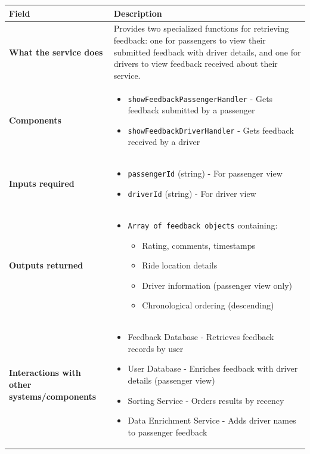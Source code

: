 \documentclass[11pt,a4paper]{article}
\begin{document}
\begin{longtable}{|p{3cm}|p{12cm}|}
\hline
\textbf{Field} & \textbf{Description} \\
\hline
\textbf{What the service does} & 
Provides two specialized functions for retrieving feedback: one for passengers to view their submitted feedback with driver details, and one for drivers to view feedback received about their service. \\
\hline
\textbf{Components} & 
\begin{itemize}[nosep]
\item \texttt{showFeedbackPassengerHandler} - Gets feedback submitted by a passenger
\item \texttt{showFeedbackDriverHandler} - Gets feedback received by a driver
\end{itemize} \\
\hline
\textbf{Inputs required} & 
\begin{itemize}[nosep]
\item \texttt{passengerId} (string) - For passenger view
\item \texttt{driverId} (string) - For driver view
\end{itemize} \\
\hline
\textbf{Outputs returned} & 
\begin{itemize}[nosep]
\item \texttt{Array of feedback objects} containing:
  \begin{itemize}[nosep]
  \item Rating, comments, timestamps
  \item Ride location details
  \item Driver information (passenger view only)
  \item Chronological ordering (descending)
  \end{itemize}
\end{itemize} \\
\hline
\textbf{Interactions with other systems/components} & 
\begin{itemize}[nosep]
\item Feedback Database - Retrieves feedback records by user
\item User Database - Enriches feedback with driver details (passenger view)
\item Sorting Service - Orders results by recency
\item Data Enrichment Service - Adds driver names to passenger feedback
\end{itemize} \\

\end{longtable}
\end{document}
